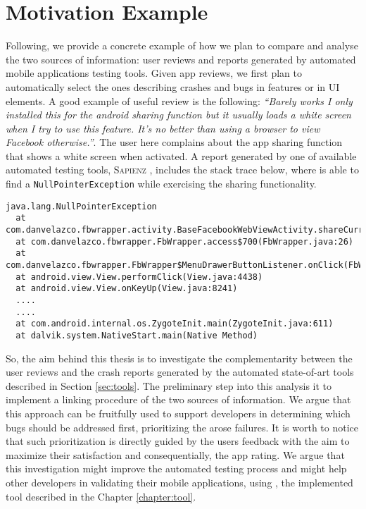 \section{Motivation Example}
Following, we provide a concrete example of how we plan to compare and analyse the two sources of information: user reviews and reports generated by automated mobile applications testing tools. Given app reviews, we first plan to automatically select the ones describing crashes and bugs in features or in UI elements.
A good example of useful review is the following: 
\smallbreak
\emph{\small``Barely works I only installed this for the android sharing function but it usually loads a white screen when I try to use this feature. It's no better than using a browser to view Facebook otherwise.''}. 
\smallbreak
The user here complains about the app sharing function that shows a white screen when activated. A report generated by one of available automated testing tools, \textsc{Sapienz} \cite{sapienz}, includes the stack trace below, where \sapienz is able to find a \texttt{NullPointerException} while exercising the sharing functionality. 
\smallbreak
\begin{lstlisting}[basicstyle=\fontsize{6}{8}\ttfamily]
java.lang.NullPointerException
  at com.danvelazco.fbwrapper.activity.BaseFacebookWebViewActivity.shareCurrentPage(BaseFacebookWebViewActivity.java:418)
  at com.danvelazco.fbwrapper.FbWrapper.access$700(FbWrapper.java:26)
  at com.danvelazco.fbwrapper.FbWrapper$MenuDrawerButtonListener.onClick(FbWrapper.java:376)
  at android.view.View.performClick(View.java:4438)
  at android.view.View.onKeyUp(View.java:8241)
  ....
  ....
  at com.android.internal.os.ZygoteInit.main(ZygoteInit.java:611)
  at dalvik.system.NativeStart.main(Native Method)
\end{lstlisting}
\smallbreak
So, the aim behind this thesis is to investigate the complementarity between the user reviews and the crash reports generated by the automated state-of-art tools described in Section \ref{sec:tools}.
The preliminary step into this analysis it to implement a linking procedure of the two sources of information. We argue that this approach can be fruitfully used to support developers in determining which bugs should be addressed first, prioritizing the arose failures. It is worth to notice that such prioritization is directly guided by the users feedback with the aim to maximize their satisfaction and consequentially, the app rating.
We argue that this investigation might improve the automated testing process and might help other developers in validating their mobile applications, using \toolname, the implemented tool described in the Chapter \ref{chapter:tool}.

